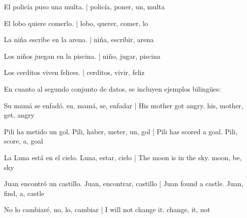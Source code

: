 \documentclass[11pt,spanish,listoffigures,listoftables]{tfgetsinf}
\begin{document}

\begin{displayquote}

El policía puso una multa. | policía, poner, un, multa

El lobo quiere comerlo. | lobo, querer, comer, lo

La niña escribe en la arena. | niña, escribir, arena

Los niños juegan en la piscina. | niño, jugar, piscina

Los cerditos viven felices. | cerditos, vivir, feliz

\end{displayquote}


En cuanto al segundo conjunto de datos, se incluyen ejemplos bilingües:


\begin{displayquote}

Su mamá se enfadó.	su, mamá, se, enfadar | His mother got angry.	his, mother, get, angry

Pili ha metido un gol.	Pili, haber, meter, un, gol | Pili has scored a goal.	Pili, score, a, goal 

La Luna está en el cielo.	Luna, estar, cielo | The moon is in the sky.	moon, be, sky 

Juan encontró un castillo.	Juan, encontrar, castillo | Juan found a castle.	Juan, find, a, castle 

No lo cambiaré.	no, lo, cambiar | I will not change it.	change, it, not  

\end{displayquote}
\end{document}
